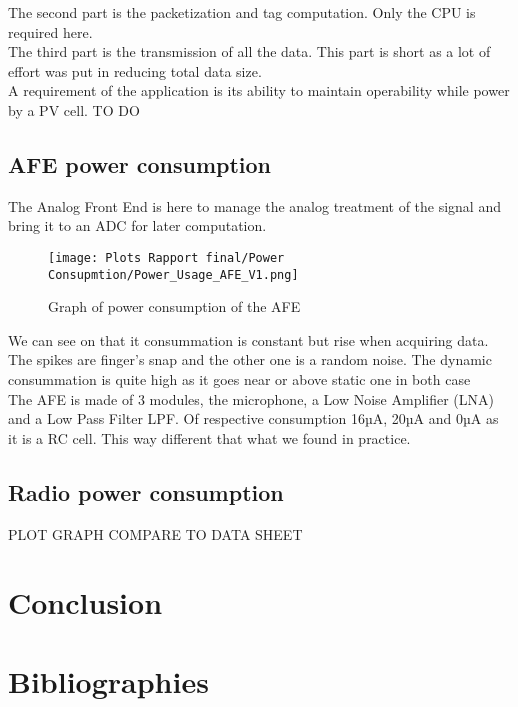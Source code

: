 \documentclass{article}
\begin{document}
The second part is the packetization and tag computation. Only the CPU is required here.\\

The third part is the transmission of all the data. This part is short as a lot of effort was put in reducing total data size.\\

A requirement of the application is its ability to maintain operability while power by a PV cell. TO DO


\subsection{AFE power consumption}

The Analog Front End is here to manage the analog treatment of the signal and bring it to an ADC for later computation.

\begin{figure}[H]
    \centering
    \texttt{[image: Plots Rapport final/Power Consupmtion/Power\_Usage\_AFE\_V1.png]}
    \caption{Graph of power consumption of the AFE}
\end{figure}

We can see on that it consummation is constant but rise when acquiring data. The spikes are finger's snap and the other one is a random noise. The dynamic consummation is quite high as it goes near or above static one in both case\\
The AFE is made of 3 modules, the microphone, a Low Noise Amplifier (LNA) and a Low Pass Filter LPF. Of respective consumption 16µA, 20µA and 0µA as it is a RC cell. This way different that what we found in practice. 


\subsection{Radio power consumption}

PLOT GRAPH
COMPARE TO DATA SHEET

\section{Conclusion}

\section{Bibliographies}

\end{document}
